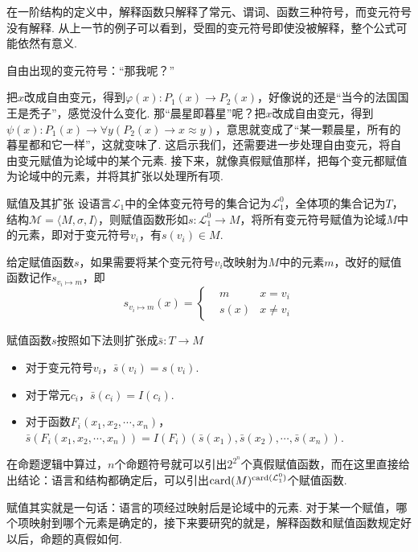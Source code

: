 在一阶结构的定义中，解释函数只解释了常元、谓词、函数三种符号，而变元符号没有解释. 从上一节的例子可以看到，受囿的变元符号即使没被解释，整个公式可能依然有意义. 

\begin{center}
    自由出现的变元符号：“那我呢？”
\end{center}

把\(x\)改成自由变元，得到\(\varphi(x): P_1(x) \to P_2(x)\)，好像说的还是“当今的法国国王是秃子”，感觉没什么变化. 那“晨星即暮星”呢？把\(x\)改成自由变元，得到\(\psi(x): P_1(x) \to \forall y (P_2(x) \to x \approx y)\)，意思就变成了“某一颗晨星，所有的暮星都和它一样”，这就变味了. 这启示我们，还需要进一步处理自由变元，将自由变元赋值为论域中的某个元素. 接下来，就像真假赋值那样，把每个变元都赋值为论域中的元素，并将其扩张以处理所有项.

\begin{definition}{赋值及其扩张}
    设语言\(\mathcal{L}_1\)中的全体变元符号的集合记为\(\mathcal{L}_1^0\)，全体项的集合记为\(T\)，结构\(\mathcal{M} = \langle M,\sigma, I \rangle\)，则赋值函数形如\(s:\mathcal{L}_1^0 \to M\)，将所有变元符号赋值为论域\(M\)中的元素，即对于变元符号\(v_i\)，有\(s(v_i) \in M\). 

    给定赋值函数\(s\)，如果需要将某个变元符号\(v_i\)改映射为\(M\)中的元素\(m\)，改好的赋值函数记作\(s_{v_i \mapsto m}\)，即
    \[s_{v_i \mapsto m}(x) = \left\{ \begin{aligned} &m &x=v_i \\ & s(x) & x \neq v_i \end{aligned} \right.\]

    赋值函数\(s\)按照如下法则扩张成\(\bar{s}: T \to M\)
    \begin{itemize}
        \item 对于变元符号\(v_i\)，\(\bar{s}(v_i) = s(v_i)\).
        \item 对于常元\(c_i\)，\(\bar{s}(c_i) = I(c_i)\).
        \item 对于函数\(F_i(x_1, x_2, \cdots, x_n)\)，\(\bar{s}(F_i(x_1, x_2, \cdots, x_n)) = I(F_i)(\bar s(x_1), \bar s(x_2), \cdots, \bar s(x_n))\).
    \end{itemize}
\end{definition}

在命题逻辑中算过，\(n\)个命题符号就可以引出\(2^{2^n}\)个真假赋值函数，而在这里直接给出结论：语言和结构都确定后，可以引出\({\rm card}(M)^{{\rm card}(\mathcal{L}_1^0)}\)个赋值函数. 

赋值其实就是一句话：语言的项经过映射后是论域中的元素. 对于某一个赋值，哪个项映射到哪个元素是确定的，接下来要研究的就是，解释函数和赋值函数规定好以后，命题的真假如何. 

